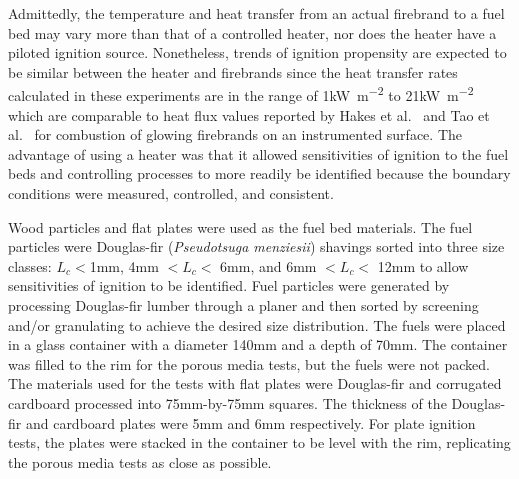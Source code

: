    Admittedly, the temperature and heat transfer from an actual firebrand to a fuel bed may vary more than that of a controlled heater, nor does the heater have a piloted ignition source. Nonetheless, trends of ignition propensity are expected to be similar between the heater and firebrands since the heat transfer rates calculated in these experiments are in the range of 1\si{\kilo\watt\per\square\meter} to 21\si{\kilo\watt\per\square\meter} which are comparable to heat flux values reported by Hakes et al.~\cite{Hakes2019a} and Tao et al.~\cite{Tao2020} for combustion of glowing firebrands on an instrumented surface. The advantage of using a heater was that it allowed sensitivities of ignition to the fuel beds and controlling processes to more readily be identified because the boundary conditions were measured, controlled, and consistent.
   
    Wood particles and flat plates were used as the fuel bed materials. The fuel particles were Douglas-fir (\textit{Pseudotsuga menziesii}) shavings sorted into three size classes: $L_{c}<$1\si{\milli\meter}, 4\si{\milli\meter} $<L_{c}<$ 6\si{\milli\meter}, and 6\si{\milli\meter} $<L_{c}<$ 12\si{\milli\meter} to allow sensitivities of ignition to be identified. Fuel particles were generated by processing Douglas-fir lumber through a planer and then sorted by screening and/or granulating to achieve the desired size distribution. The fuels were placed in a glass container with a diameter 140\si{\milli\meter} and a depth of 70\si{\milli\meter}. The container was filled to the rim for the porous media tests, but the fuels were not packed. The materials used for the tests with flat plates were Douglas-fir and corrugated cardboard processed into 75\si{\milli\meter}-by-75\si{\milli\meter} squares. The thickness of the Douglas-fir and cardboard plates were 5\si{\milli\meter} and 6\si{\milli\meter} respectively. For plate ignition tests, the plates were stacked in the container to be level with the rim, replicating the porous media tests as close as possible.
   
